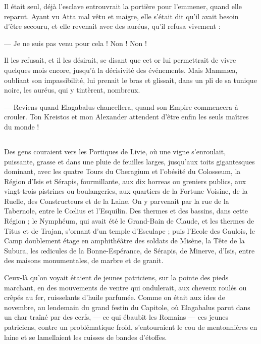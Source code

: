\documentclass[a4paper, 11pt, oneside, polutonikogreek, french]{article}
\begin{document}
Il était seul, déjà l'esclave entrouvrait la portière pour l'emmener, quand elle reparut. Ayant vu Atta mal vêtu et maigre, elle s'était dit qu'il avait besoin d'être secouru, et elle revenait avec des auréus, qu'il refusa vivement :

--- Je ne suis pas venu pour cela ! Non ! Non !

Il les refusait, et il les désirait, se disant que cet or lui permettrait de vivre quelques mois encore, jusqu'à la décisivité des événements. Mais Mammæa, oubliant son impassibilité, lui prenait le bras et glissait, dans un pli de sa tunique noire, les auréus, qui y tintèrent, nombreux.

--- Reviens quand Elagabalus chancellera, quand son Empire commencera à crouler. Ton Kreistos et mon Alexander attendent d'être enfin les seuls maîtres du monde !
\clearpage
\subsection{}
\paragraph{}
Des gens couraient vers les Portiques de Livie, où une vigne s'enroulait, puissante, grasse et dans une pluie de feuilles larges, jusqu'aux toits gigantesques dominant, avec les quatre Tours du Cheragium et l'obésité du Colosseum, la Région d'Isis et Sérapis, fourmillante, aux dix horreas ou greniers publics, aux vingt-trois pistrines ou boulangeries, aux quartiers de la Fortune Voisine, de la Ruelle, des Constructeurs et de la Laine. On y parvenait par la rue de la Tabernole, entre le Cœlius et l'Esquilin. Des thermes et des bassins, dans cette Région ; le Nymphéum, qui avait été le Grand-Bain de Claude, et les thermes de Titus et de Trajan, s'ornant d'un temple d'Esculape ; puis l'Ecole des Gaulois, le Camp doublement étage en amphithéâtre des soldats de Misène, la Tête de la Subura, les œdicules de la Bonne-Espérance, de Sérapis, de Minerve, d'Isis, entre des maisons monumentales, de marbre et de granit.

Ceux-là qu'on voyait étaient de jeunes patriciens, sur la pointe des pieds marchant, en des mouvements de ventre qui ondulerait, aux cheveux roulés ou crêpés au fer, ruisselants d'huile parfumée. Comme on était aux ides de novembre, au lendemain du grand festin du Capitole, où Elagabalus parut dans un char traîné par des cerfs, --- ce qui ébaubit les Romains --- ces jeunes patriciens, contre un problématique froid, s'entouraient le cou de mentonnières en laine et se lamellaient les cuisses de bandes d'étoffes.
\end{document}
